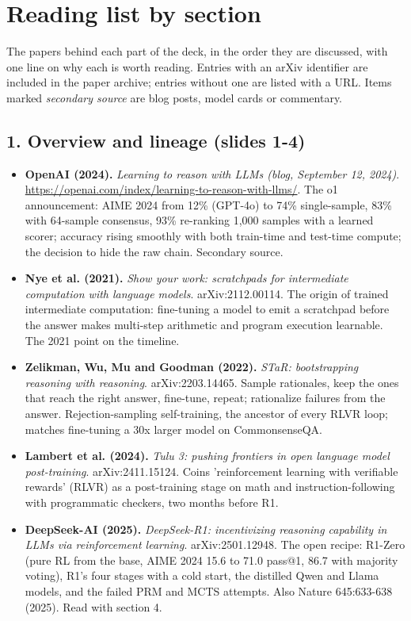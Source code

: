 \section*{Reading list by section}
The papers behind each part of the deck, in the order they are discussed, with one line on why each is worth reading. Entries with an arXiv identifier are included in the paper archive; entries without one are listed with a URL. Items marked \emph{secondary source} are blog posts, model cards or commentary.

\subsection*{1. Overview and lineage (slides 1-4)}
\begin{itemize}[leftmargin=1.2em,itemsep=3pt]\sloppy
\item \textbf{OpenAI (2024).} \textit{Learning to reason with LLMs (blog, September 12, 2024)}. \url{https://openai.com/index/learning-to-reason-with-llms/}. The o1 announcement: AIME 2024 from 12\% (GPT-4o) to 74\% single-sample, 83\% with 64-sample consensus, 93\% re-ranking 1,000 samples with a learned scorer; accuracy rising smoothly with both train-time and test-time compute; the decision to hide the raw chain. Secondary source.
\item \textbf{Nye et al. (2021).} \textit{Show your work: scratchpads for intermediate computation with language models}. arXiv:2112.00114. The origin of trained intermediate computation: fine-tuning a model to emit a scratchpad before the answer makes multi-step arithmetic and program execution learnable. The 2021 point on the timeline.
\item \textbf{Zelikman, Wu, Mu and Goodman (2022).} \textit{STaR: bootstrapping reasoning with reasoning}. arXiv:2203.14465. Sample rationales, keep the ones that reach the right answer, fine-tune, repeat; rationalize failures from the answer. Rejection-sampling self-training, the ancestor of every RLVR loop; matches fine-tuning a 30x larger model on CommonsenseQA.
\item \textbf{Lambert et al. (2024).} \textit{Tulu 3: pushing frontiers in open language model post-training}. arXiv:2411.15124. Coins 'reinforcement learning with verifiable rewards' (RLVR) as a post-training stage on math and instruction-following with programmatic checkers, two months before R1.
\item \textbf{DeepSeek-AI (2025).} \textit{DeepSeek-R1: incentivizing reasoning capability in LLMs via reinforcement learning}. arXiv:2501.12948. The open recipe: R1-Zero (pure RL from the base, AIME 2024 15.6 to 71.0 pass@1, 86.7 with majority voting), R1's four stages with a cold start, the distilled Qwen and Llama models, and the failed PRM and MCTS attempts. Also Nature 645:633-638 (2025). Read with section 4.

\end{itemize}
